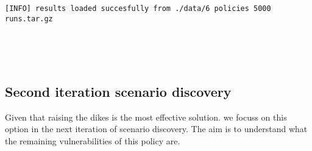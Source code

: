 \documentclass{article}
\begin{document}
    \begin{Verbatim}[commandchars=\\\{\}]
[INFO] results loaded succesfully from ./data/6 policies 5000 runs.tar.gz
    \end{Verbatim}

    \begin{center}
    \end{center}
    { \hspace*{\fill} \\}
    
    \begin{center}
    \end{center}
    { \hspace*{\fill} \\}
    
    \subsection{Second iteration scenario
discovery}\label{second-iteration-scenario-discovery}

Given that raising the dikes is the most effective solution. we focuss
on this option in the next iteration of scenario discovery. The aim is
to understand what the remaining vulnerabilities of this policy are.
\end{document}
